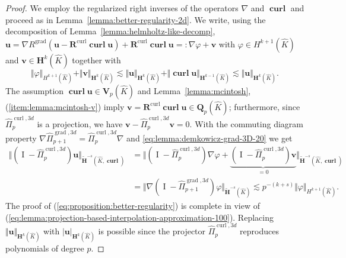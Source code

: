 \documentclass{article}
\newcommand{\hatPicurlcom}{\widehat \Pi^{\operatorname*{curl},3d}_p}
\newcommand{\hatPigradcom}{\widehat\Pi^{\operatorname*{grad},3d}_{p+1}}
\begin{document}
\begin{proof}
We employ the regularized right inverses of the operators $\nabla$ and
$\operatorname*{\mathbf{curl}}$ and proceed as in Lemma~\ref{lemma:better-regularity-2d}. We
write, using the decomposition of Lemma~\ref{lemma:helmholtz-like-decomp},
$\displaystyle 
{\mathbf{u}}=\nabla R^{\operatorname*{grad}}({\mathbf{u}}-{\mathbf{R}%
}^{\operatorname*{curl}}\operatorname*{\mathbf{curl}}{\mathbf{u}})+{\mathbf{R}}^{\operatorname*{curl}}\operatorname*{\mathbf{curl}}{\mathbf{u}}=:\nabla
\varphi+{\mathbf{v}}%
$
with $\varphi\in H^{k+1}(\widehat{K})$ and ${\mathbf{v}}\in{\mathbf{H}}%
^{k}(\widehat{K})$ together with
\begin{equation}
\Vert\varphi\Vert_{H^{k+1}(\widehat{K})}+\Vert{\mathbf{v}}\Vert_{{\mathbf{H}%
}^{k}(\widehat{K})}\lesssim  \Vert{\mathbf{u}}\Vert_{{\mathbf{H}}%
^{k}(\widehat{K})}+\Vert\operatorname*{\mathbf{curl}}{\mathbf{u}}\Vert_{{\mathbf{H}%
}^{k-1}(\widehat{K})}  \lesssim \Vert{\mathbf{u}}\Vert_{{\mathbf{H}}%
^{k}(\widehat{K})}.
\label{eq:lemma:projection-based-interpolation-approximation-100}%
\end{equation}
The assumption $\operatorname*{\mathbf{curl}}{\mathbf{u}}\in {\mathbf V}_p(\widehat K)$ 
and %
Lemma~\ref{lemma:mcintosh}, (\ref{item:lemma:mcintosh-v}) 
imply ${\mathbf{v}}={\mathbf{R}}%
^{\operatorname*{curl}}\operatorname*{\mathbf{curl}}{\mathbf{u}}\in
\mathbf{Q}_p(\widehat{K})$; furthermore, since
$\hatPicurlcom$ is a projection, we have 
${\mathbf{v}}-\hatPicurlcom{\mathbf{v}}=0$. 
With the commuting diagram property $\nabla\hatPigradcom=\hatPicurlcom\nabla$ and \eqref{eq:lemma:demkowicz-grad-3D-20} we get
\begin{align*}
\Vert(\operatorname{I}-\hatPicurlcom){\mathbf{u}}\Vert
_{\widetilde{\mathbf{H}}^{-s}(\widehat{K},\operatorname{\mathbf{curl}})} &= \Vert(\operatorname{I}-\hatPicurlcom)\nabla\varphi+\underbrace{(\operatorname{I}-\hatPicurlcom){\mathbf{v}}}_{=0}\Vert_{\widetilde{\mathbf{H}}^{-s}(\widehat{K},\operatorname{\mathbf{curl}})} \\
&= \Vert\nabla(\operatorname{I}-\hatPigradcom)\varphi\Vert_{\widetilde{\mathbf{H}}^{-s}(\widehat{K})}\lesssim p^{-(k+s)}\Vert\varphi\Vert_{H^{k+1}(\widehat{K})}.
\end{align*}
The proof of (\ref{eq:proposition:better-regularity})
is complete in view of
(\ref{eq:lemma:projection-based-interpolation-approximation-100}). Replacing
$\Vert{\mathbf{u}}\Vert_{{\mathbf{H}}^{k}(\widehat{K})}$ with $|{\mathbf{u}%
}|_{{\mathbf{H}}^{k}(\widehat{K})}$ is possible since the
projector $\hatPicurlcom$ reproduces polynomials
of degree $p$.
\end{proof}
\end{document}

